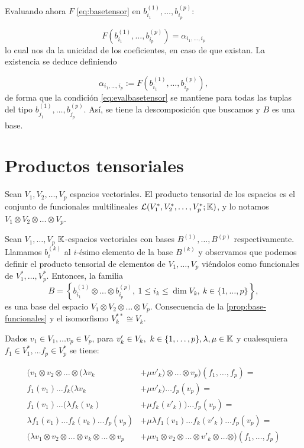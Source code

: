 Evaluando ahora \(F\) \eqref{eq:basetensor} en
\(b_{i_1}^{(1)},\dots,b_{i_p}^{(p)}\):

\begin{equation*}
F\left(b_{i_1}^{(1)},\dots,b_{i_p}^{(p)}\right)=\alpha_{i_1,\dots,i_p}
\end{equation*}
lo cual nos da la unicidad de los coeficientes, en caso de que existan.
La existencia se deduce definiendo

\begin{equation*}
\alpha_{i_1,\dots,i_p}:=F\left(b_{i_1}^{(1)},\dots,b_{i_p}^{(p)}\right),
\end{equation*}
de forma que la condición \eqref{eq:evalbasetensor} se mantiene para
todas las tuplas del tipo \(b_{j_1}^{(1)},\dots,b_{j_p}^{(p)}\). Así, se
tiene la descomposición que buscamos y \(B\) es una base.

\proofe

\prope

\section{Productos tensoriales}\label{productos-tensoriales}

Sean \(V_1,V_2,\dots,V_p\) espacios vectoriales. El producto tensorial
de los espacios es el conjunto de funcionales multilineales
\(\mathcal{L}(V_1^*,V_2^*,\dots,V_p^*;\mathbb{K})\), y lo notamos
\(V_1\otimes V_2\otimes\dots\otimes V_p\). 

\corb\label{cor:base-tensor}
Sean \(V_1,\dots,V_p\) \(\mathbb{K}\)-espacios vectoriales con bases
\(B^{(1)},\dots,B^{(p)}\) respectivamente. Llamamos \(b_i^{(k)}\) al
\(i\)-ésimo elemento de la base \(B^{(k)}\) y observamos que podemos
definir el producto tensorial de elementos de \(V_1,\dots,V_p\)
viéndolos como funcionales de \(V_1^*,\dots,V_p^*\). Entonces, la
familia
\[B=\left\{b_{i_1}^{(1)}\otimes\dots\otimes b_{i_p}^{(p)},\ 1\leq i_k\leq\dim{V_k},\ k\in\{1,\dots,p\}\right\},\]
es una base del espacio \(V_1\otimes V_2\otimes\dots\otimes V_p\).
\proofb
Consecuencia de la \autoref{prop:base-funcionales} y el
isomorfismo \(V_k^{**}\cong V_k\). \proofe
\core

\remb
Dados \(v_1\in V_1,\dots v_p\in V_p\), para
\(v'_k\in V_k,\ k\in\{1,\dots,p\},\lambda,\mu\in\KK\) y cualesquiera
\(f_1\in V_1^*,\dots f_p\in V_p^*\) se tiene:

\begin{align*}
  (v_1\otimes v_2\otimes\dots\otimes(\lambda v_k &+ \mu v'_k)\otimes\dots\otimes v_p)(f_1,\dots,f_p)=\\
  f_1(v_1)\dots f_k(\lambda v_k &+ \mu v'_k) \dots f_p(v_p) =\\
  f_1(v_1)\dots (\lambda f_k(v_k) &+ \mu f_k(v'_k)) \dots f_p(v_p) = \\
  \lambda f_1(v_1)\dots f_k(v_k) \dots f_p(v_p) &+ \mu \lambda f_1(v_1)\dots f_k(v'_k) \dots f_p(v_p) =\\
  (\lambda v_1\otimes v_2\otimes\dots\otimes v_k\otimes\dots\otimes v_p &+\mu v_1\otimes v_2\otimes\dots\otimes v'_k\otimes\dots\otimes)(f_1,\dots,f_p)
\end{align*}


